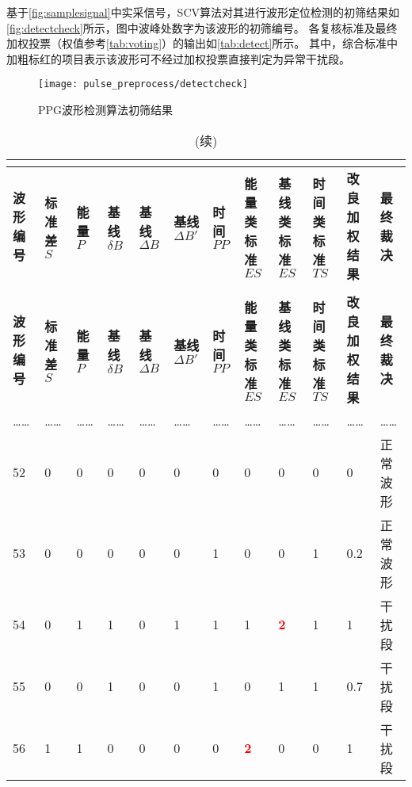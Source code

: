 {基于\autoref{fig:samplesignal}中实采信号，SCV算法对其进行波形定位检测的初筛结果如\autoref{fig:detectcheck}所示，图中波峰处数字为该波形的初筛编号。
各复核标准及最终加权投票（权值参考\autoref{tab:voting}）的输出如\autoref{tab:detect}所示。
其中，综合标准中加粗标红的项目表示该波形可不经过加权投票直接判定为异常干扰段。
\begin{figure}[htbp]
    \centering
    \texttt{[image: pulse\_preprocess/detectcheck]}
    \caption{\label{fig:detectcheck}PPG波形检测算法初筛结果}
\end{figure}
\begin{landscape}
	\begin{longtable}{m{1.5cm}<{\centering}m{1.5cm}<{\centering}m{1cm}<{\centering}m{1cm}<{\centering}m{1.5cm}<{\centering}m{1.5cm}<{\centering}m{1.5cm}<{\centering}m{2cm}<{\centering}m{2cm}<{\centering}m{2cm}<{\centering}m{2cm}<{\centering}m{1.5cm}<{\centering}}
		\caption{SCV算法对初筛波形的复核及决策输出(局部)}\\
		\label{tab:detect}\\
		\toprule
        \textbf{波形编号}&\textbf{标准差 $S$}&\textbf{能量 $P$}&\textbf{基线 $\delta B$}&\textbf{基线 $\Delta B$}&\textbf{基线 $\Delta B'$}&\textbf{时间 $PP$}&\textbf{能量类标准 $ES$}&
        \textbf{基线类标准 $ES$}&\textbf{时间类标准 $TS$}&\textbf{改良加权结果}&\textbf{最终裁决}\\
        \midrule
        \endfirsthead
        \caption[]{(续)}\\
        \midrule
        \textbf{波形编号}&\textbf{标准差 $S$}&\textbf{能量 $P$}&\textbf{基线 $\delta B$}&\textbf{基线 $\Delta B$}&\textbf{基线 $\Delta B'$}&\textbf{时间 $PP$}&\textbf{能量类标准 $ES$}&
        \textbf{基线类标准 $ES$}&\textbf{时间类标准 $TS$}&\textbf{改良加权结果}&\textbf{最终裁决}\\
        \midrule
        \endhead 
        \midrule
        \endfoot
        \bottomrule
        \endlastfoot
        …… & …… & …… & …… & …… & …… & …… & …… & …… & …… & …… & ……\\
        52 & 0 & 0 & 0 & 0 & 0 & 0 & 0 & 0 & 0 & 0 & 正常波形\\
        53 & 0 & 0 & 0 & 0 & 0 & 1 & 0 & 0 & 1 & 0.2 & 正常波形\\
        54 & 0 & 1 & 1 & 0 & 1 & 1 & 1 & \textcolor{red}{\textbf{2}}& 1 & 1 & 干扰段\\
        55 & 0 & 0 & 1 & 0 & 0 & 1 & 0 & 1 & 1 & 0.7 & 干扰段\\
        56 & 1 & 1 & 0 & 0 & 0 & 0 & \textcolor{red}{\textbf{2}}& 0 & 0 & 1 & 干扰段\\

\end{longtable}
\end{landscape}}
